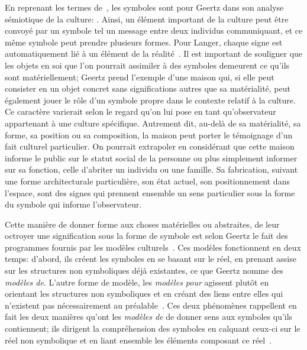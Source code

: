 En reprenant les termes de~\citet{Langer1962}, les symboles sont pour Geertz dans son analyse sémiotique de la culture: .
Ainsi, un élément important de la culture peut être convoyé par un symbole tel un message entre deux individus communiquant, et ce même symbole peut prendre plusieurs formes.
Pour Langer, chaque signe est automatiquement lié à un élément de la réalité~\citep[62]{Langer1962}.
Il est important de souligner que les objets en soi que l'on pourrait assimiler à des symboles demeurent ce qu'ils sont matériellement; Geertz prend l'exemple d'une maison qui, si elle peut consister en un objet concret sans significations autres que sa matérialité, peut également jouer le rôle d'un symbole propre dans le contexte relatif à la culture.
Ce caractère varierait selon le regard qu'on lui pose en tant qu'observateur appartenant à une culture spécifique.
Autrement dit, au-delà de sa matérialité, sa forme, sa position ou sa composition, la maison peut porter le témoignage d'un fait culturel particulier.
On pourrait extrapoler en considérant que cette maison informe le public sur le statut social de la personne ou plus simplement informer sur sa fonction, celle d'abriter un individu ou une famille.
Sa fabrication, suivant une forme architecturale particulière, son état actuel, son positionnement dans l'espace, sont des signes qui prennent ensemble un sens particulier sous la forme du symbole qui informe l'observateur.

Cette manière de donner forme aux choses matérielles ou abstraites, de leur octroyer une signification sous la forme de symbole est selon Geertz le fait des programmes fournis par les modèles culturels~\citep[25]{Geertz1972}.
Ces modèles fonctionnent en deux temps: d'abord, ils créent les symboles en se basant sur le réel, en prenant assise sur les structures non symboliques déjà existantes, ce que Geertz nomme des \emph{modèles de}.
L'autre forme de modèle, les \emph{modèles pour} agissent plutôt en orientant les structures non symboliques et en créant des liens entre elles qui n'existent pas nécessairement au préalable~\citep[26--27]{Geertz1972}.
Ces deux phénomènes rappellent en fait les deux manières qu'ont les \emph{modèles de} de donner sens aux symboles qu'ils contiennent; ils dirigent la compréhension des symboles en calquant ceux-ci sur le réel non symbolique et en liant ensemble les éléments composant ce réel~.

